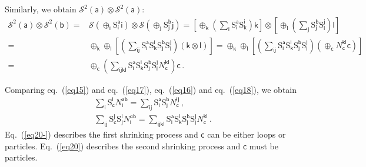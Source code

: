 \documentclass[11pt,nofootinbib,preprint]{revtex4-1}
\begin{document}
Similarly, we obtain $\mathcal{S} ^2\left( \mathsf{a} \right) \otimes \mathcal{S} ^2\left( \mathsf{a} \right)$:
\begin{align}
	\mathcal{S} ^2\left( \mathsf{a} \right) \otimes \mathcal{S} ^2\left( \mathsf{b} \right) =&\mathcal{S} \left( \oplus _{\mathsf{i}}\mathrm{S}_{\mathsf{i}}^{\mathsf{a}}\mathsf{i} \right) \otimes \mathcal{S} \left( \oplus _{\mathsf{j}}\mathrm{S}_{\mathsf{j}}^{\mathsf{b}}\mathsf{j} \right) =\left[ \oplus _{\mathsf{k}}\left( \sum_{\mathsf{i}}{\mathrm{S}_{\mathsf{i}}^{\mathsf{a}}\mathrm{S}_{\mathsf{k}}^{\mathsf{i}}} \right) \mathsf{k} \right] \otimes \left[ \oplus _{\mathsf{l}}\left( \sum_{\mathsf{j}}{\mathrm{S}_{\mathsf{j}}^{\mathsf{b}}\mathrm{S}_{\mathsf{l}}^{\mathsf{j}}} \right) \mathsf{l} \right] \nonumber
	\\
	=&\oplus _{\mathsf{k}}\oplus _{\mathsf{l}}\left[ \left( \sum_{\mathsf{ij}}{\mathrm{S}_{\mathsf{i}}^{\mathsf{a}}\mathrm{S}_{\mathsf{k}}^{\mathsf{i}}\mathrm{S}_{\mathsf{j}}^{\mathsf{b}}\mathrm{S}_{\mathsf{l}}^{\mathsf{j}}} \right) \left( \mathsf{k}\otimes \mathsf{l} \right) \right] =\oplus _{\mathsf{k}}\oplus _{\mathsf{l}}\left[ \left( \sum_{\mathsf{ij}}{\mathrm{S}_{\mathsf{i}}^{\mathsf{a}}\mathrm{S}_{\mathsf{k}}^{\mathsf{i}}\mathrm{S}_{\mathsf{j}}^{\mathsf{b}}\mathrm{S}_{\mathsf{l}}^{\mathsf{j}}} \right) \left( \oplus _{\mathsf{c}}N_{\mathsf{c}}^{\mathsf{kl}}\mathsf{c} \right) \right] \nonumber
	\\
	=&\oplus _{\mathsf{c}}\left( \sum_{\mathsf{ijkl}}{\mathrm{S}_{\mathsf{i}}^{\mathsf{a}}\mathrm{S}_{\mathsf{k}}^{\mathsf{i}}\mathrm{S}_{\mathsf{j}}^{\mathsf{b}}\mathrm{S}_{\mathsf{l}}^{\mathsf{j}}}N_{\mathsf{c}}^{\mathsf{kl}} \right) \mathsf{c}\,.
	\label{eq18}
\end{align}

Comparing eq.~(\ref{eq15}) and eq.~(\ref{eq17}), eq.~(\ref{eq16}) and eq.~(\ref{eq18}), we obtain
\begin{gather}
	\sum_{\mathsf{i}}{\mathrm{S}_{\mathsf{c}}^{\mathsf{i}}N_{\mathsf{i}}^{\mathsf{ab}}}=\sum_{\mathsf{ij}}{\mathrm{S}_{\mathsf{i}}^{\mathsf{a}}\mathrm{S}_{\mathsf{j}}^{\mathsf{b}}N_{\mathsf{c}}^{\mathsf{ij}}}\,,\label{eq20-}
	\\ \sum_{\mathsf{ij}}{\mathrm{S}_{\mathsf{c}}^{\mathsf{j}}\mathrm{S}_{\mathsf{j}}^{\mathsf{i}}N_{\mathsf{i}}^{a\mathsf{b}}}=\sum_{\mathsf{ijkl}}{\mathrm{S}_{\mathsf{i}}^{\mathsf{a}}\mathrm{S}_{\mathsf{k}}^{\mathsf{i}}\mathrm{S}_{\mathsf{j}}^{\mathsf{b}}\mathrm{S}_{\mathsf{l}}^{\mathsf{j}}}N_{\mathsf{c}}^{\mathsf{kl}}\,.
	\label{eq20}
\end{gather}
Eq.~(\ref{eq20-}) describes the first shrinking process and $\mathsf{c}$ can be either loops or particles. Eq.~(\ref{eq20}) describes the second shrinking process and $\mathsf{c}$ must be particles. 
\end{document}
